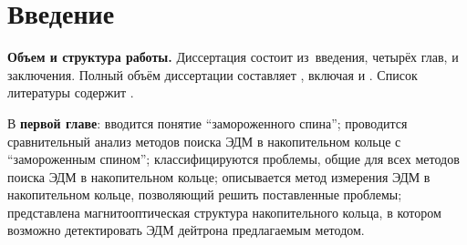 \chapter*{Введение}                         %

\newcommand{\actuality}{}
\newcommand{\progress}{}
\newcommand{\aim}{{\textbf\aimTXT}}
\newcommand{\tasks}{\textbf{\tasksTXT}}
\newcommand{\novelty}{\textbf{\noveltyTXT}}
\newcommand{\influence}{\textbf{\influenceTXT}}
\newcommand{\methods}{\textbf{\methodsTXT}}
\newcommand{\defpositions}{\textbf{\defpositionsTXT}}
\newcommand{\reliability}{\textbf{\reliabilityTXT}}
\newcommand{\probation}{\textbf{\probationTXT}}
\newcommand{\contribution}{\textbf{\contributionTXT}}
\newcommand{\publications}{\textbf{\publicationsTXT}}


\textbf{Объем и структура работы.} Диссертация состоит из~введения, четырёх глав,
и заключения.
%
Полный объём диссертации составляет
, включая
 и
.   Список литературы содержит
.

В \textbf{первой главе}: вводится понятие ``замороженного спина''; проводится сравнительный анализ методов поиска ЭДМ в накопительном кольце с ``замороженным спином''; классифицируются проблемы, общие для всех методов поиска ЭДМ в накопительном кольце; описывается метод измерения ЭДМ в накопительном кольце, позволяющий решить поставленные проблемы; представлена магнитооптическая структура накопительного кольца, в котором возможно детектировать ЭДМ дейтрона предлагаемым методом.

